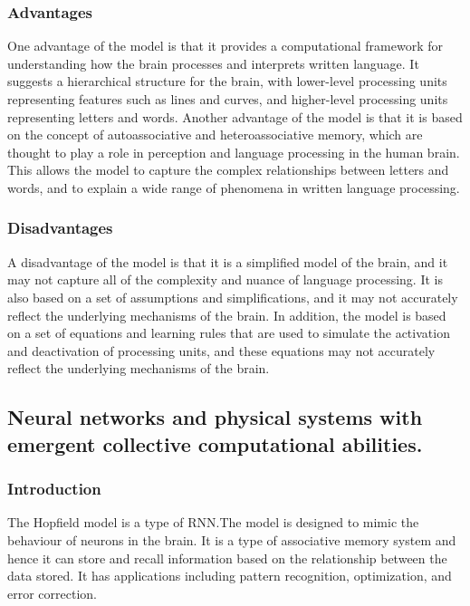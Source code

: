 \subsubsection{Advantages }
One advantage of the model is that it provides a computational framework for
understanding how the brain processes and interprets written language. It
suggests a hierarchical structure for the brain, with lower-level processing
units representing features such as lines and curves, and higher-level
processing units representing letters and words. Another advantage of the model
is that it is based on the concept of autoassociative and heteroassociative
memory, which are thought to play a role in perception and language processing
in the human brain. This allows the model to capture the complex relationships
between letters and words, and to explain a wide range of phenomena in written
language processing.

\subsubsection{Disadvantages}
A disadvantage of the model is that it is a simplified model of the brain, and
it may not capture all of the complexity and nuance of language processing. It
is also based on a set of assumptions and simplifications, and it may not
accurately reflect the underlying mechanisms of the brain. In addition, the
model is based on a set of equations and learning rules that are used to
simulate the activation and deactivation of processing units, and these
equations may not accurately reflect the underlying mechanisms of the brain.

\subsection{Neural networks and physical systems with emergent collective computational abilities.}
\subsubsection{Introduction}
The Hopfield model\cite{hopfield} is a type of RNN.\@ The model is designed to
mimic the behaviour of neurons in the brain. It is a type of associative memory
system and hence it can store and recall information based on the relationship
between the data stored. It has applications including pattern recognition,
optimization, and error correction.
